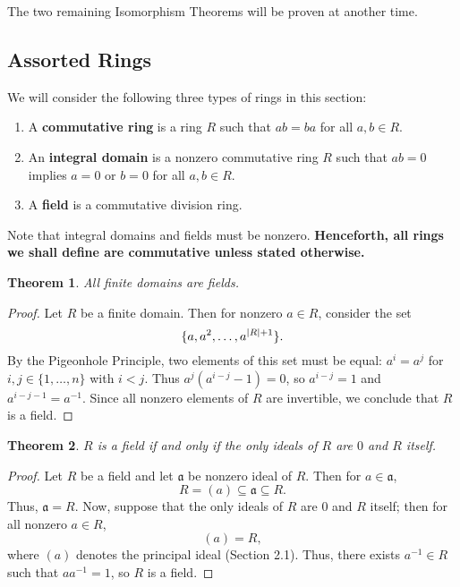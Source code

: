 \documentclass[11pt]{article}
\newtheorem{theorem}{Theorem}
\begin{document}
The two remaining Isomorphism Theorems will be proven at another time.


\subsection{Assorted Rings}

We will consider the following three types of rings in this section:
\begin{enumerate}
	\item A \textbf{commutative ring} is a ring $R$ such that $ab = ba$ for all $a, b \in R$.
	\item An \textbf{integral domain} is a nonzero commutative ring $R$ such that $ab = 0$ implies $a = 0$ or $b = 0$ for all $a, b \in R$.
	\item A \textbf{field} is a commutative division ring.
\end{enumerate}

Note that integral domains and fields must be nonzero. \textbf{Henceforth, all rings we shall define are commutative unless stated otherwise.}

\begin{adjustwidth}{0.5cm}{}
	\begin{theorem}
		All finite domains are fields.
	\end{theorem}
	\begin{proof}
		Let $R$ be a finite domain. Then for nonzero $a \in R$, consider the set
		\[
			\{ a, a^{2}, \ldots, a^{\abs{R} + 1} \}.
		\]
		By the Pigeonhole Principle, two elements of this set must be equal: $a^{i} = a^{j}$ for $i, j \in \{ 1, \ldots, n \}$ with $i < j$. Thus $a^{j}(a^{i - j} - 1) = 0$, so $a^{i - j} = 1$ and $a^{i - j - 1} = a^{-1}$. Since all nonzero elements of $R$ are invertible, we conclude that $R$ is a field.
	\end{proof}
\end{adjustwidth}

\begin{adjustwidth}{0.5cm}{}
	\begin{theorem}
		$R$ is a field if and only if the only ideals of $R$ are $0$ and $R$ itself.
	\end{theorem}
	\begin{proof}
		Let $R$ be a field and let $\mathfrak{a}$ be nonzero ideal of $R$. Then for $a \in \mathfrak{a}$,
		\[
			R = (a) \subseteq \mathfrak{a} \subseteq R.
		\]
		Thus, $\mathfrak{a} = R$. Now, suppose that the only ideals of $R$ are $0$ and $R$ itself; then for all nonzero $a \in R$,
		\[
			(a) = R,
		\]
		where $(a)$ denotes the principal ideal (Section 2.1). Thus, there exists $a^{-1} \in R$ such that $a a^{-1} = 1$, so $R$ is a field.
	\end{proof}
\end{adjustwidth}
\end{document}
